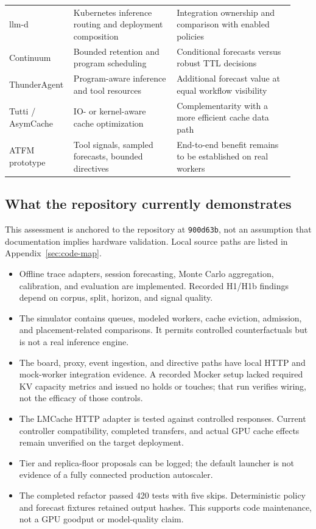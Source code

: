 \begin{longtable}{@{}p{0.18\linewidth}p{0.35\linewidth}p{0.40\linewidth}@{}}
llm-d & Kubernetes inference routing and deployment composition & Integration ownership and comparison with enabled policies\\
Continuum & Bounded retention and program scheduling & Conditional forecasts versus robust TTL decisions\\
ThunderAgent & Program-aware inference and tool resources & Additional forecast value at equal workflow visibility\\
Tutti / AsymCache & IO- or kernel-aware cache optimization & Complementarity with a more efficient cache data path\\
ATFM prototype & Tool signals, sampled forecasts, bounded directives & End-to-end benefit remains to be established on real workers\\\bottomrule
\end{longtable}

\subsection{What the repository currently demonstrates}
This assessment is anchored to the repository at \texttt{900d63b}, not an
assumption that documentation implies hardware validation. Local source paths
are listed in Appendix~\ref{sec:code-map}.

\begin{itemize}
\item Offline trace adapters, session forecasting, Monte Carlo aggregation,
calibration, and evaluation are implemented. Recorded H1/H1b findings depend
on corpus, split, horizon, and signal quality.
\item The simulator contains queues, modeled workers, cache eviction, admission,
and placement-related comparisons. It permits controlled counterfactuals but
is not a real inference engine.
\item The board, proxy, event ingestion, and directive paths have local HTTP and
mock-worker integration evidence. A recorded Mocker setup lacked required KV
capacity metrics and issued no holds or touches; that run verifies wiring,
not the efficacy of those controls.
\item The LMCache HTTP adapter is tested against controlled responses. Current
controller compatibility, completed transfers, and actual GPU cache effects
remain unverified on the target deployment.
\item Tier and replica-floor proposals can be logged; the default launcher is
not evidence of a fully connected production autoscaler.
\item The completed refactor passed 420 tests with five skips. Deterministic
policy and forecast fixtures retained output hashes. This supports code
maintenance, not a GPU goodput or model-quality claim.
\end{itemize}

